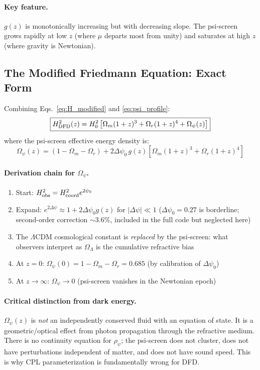 \documentclass[11pt,a4paper]{article}
\newcommand{\LCDM}{$\Lambda$CDM}
\begin{document}
\paragraph{Key feature.} $g(z)$ is monotonically increasing but with
decreasing slope. The psi-screen grows rapidly at low $z$ (where
$\mu$ departs most from unity) and saturates at high $z$
(where gravity is Newtonian).

\subsection{The Modified Friedmann Equation: Exact Form}

Combining Eqs.~\eqref{eq:H_modified} and \eqref{eq:psi_profile}:
\begin{equation}
\boxed{
H^2_{\rm DFD}(z) = H^2_0\left[\Omega_m(1+z)^3 + \Omega_r(1+z)^4
+ \Omega_\psi(z)\right]
}
\label{eq:friedmann_dfd}
\end{equation}
where the psi-screen effective energy density is:
\begin{equation}
\Omega_\psi(z) = (1 - \Omega_m - \Omega_r) + 2\Delta\psi_0\,g(z)
\left[\Omega_m(1+z)^3 + \Omega_r(1+z)^4\right]
\label{eq:omega_psi}
\end{equation}

\paragraph{Derivation chain for $\Omega_\psi$.}
\begin{enumerate}[nosep]
\item Start: $H_{\rm obs}^2 = H_{\rm coord}^2 e^{2\psi_0}$
\item Expand: $e^{2\Delta\psi} \approx 1 + 2\Delta\psi_0 g(z)$
  for $|\Delta\psi| \ll 1$ ($\Delta\psi_0 = 0.27$ is borderline;
  second-order correction $\sim 3.6\%$, included in the full code
  but neglected here)
\item The \LCDM{} cosmological constant is \emph{replaced} by the
  psi-screen: what observers interpret as $\Omega_\Lambda$ is the
  cumulative refractive bias
\item At $z = 0$: $\Omega_\psi(0) = 1 - \Omega_m - \Omega_r = 0.685$
  (by calibration of $\Delta\psi_0$)
\item At $z \to \infty$: $\Omega_\psi \to 0$ (psi-screen vanishes in
  the Newtonian epoch)
\end{enumerate}

\paragraph{Critical distinction from dark energy.} $\Omega_\psi(z)$
is \emph{not} an independently conserved fluid with an equation of
state. It is a geometric/optical effect from photon propagation through
the refractive medium. There is no continuity equation for $\rho_\psi$;
the psi-screen does not cluster, does not have perturbations independent
of matter, and does not have sound speed. This is why CPL
parameterization is fundamentally wrong for DFD.
\end{document}
